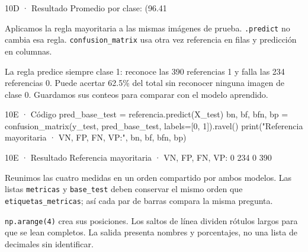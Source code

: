 \begin{Salida}{10D · Resultado}
Promedio por clase: (96.41%
\end{Salida}

\label{paso-10e}

Aplicamos la regla mayoritaria a las mismas imágenes de prueba. \texttt{\small .\allowbreak{}predict} no cambia esa regla. \texttt{\small confusion\_\allowbreak{}matrix} usa otra vez referencia en filas y predicción en columnas.

La regla predice siempre clase 1: reconoce las 390 referencias 1 y falla las 234 referencias 0. Puede acertar 62.5\% del total sin reconocer ninguna imagen de clase 0. Guardamos sus conteos para comparar con el modelo aprendido.


\begin{Codigo}{10E · Código}
pred_base_test = referencia.predict(X_test)
bn, bf, bfn, bp = confusion_matrix(y_test, pred_base_test, labels=[0, 1]).ravel()
print("Referencia mayoritaria · VN, FP, FN, VP:", bn, bf, bfn, bp)
\end{Codigo}

\begin{Salida}{10E · Resultado}
Referencia mayoritaria · VN, FP, FN, VP: 0 234 0 390
\end{Salida}

\label{paso-10f}

Reunimos las cuatro medidas en un orden compartido por ambos modelos. Las listas \texttt{\small metricas} y \texttt{\small base\_\allowbreak{}test} deben conservar el mismo orden que \texttt{\small etiquetas\_\allowbreak{}metricas}; así cada par de barras compara la misma pregunta.

\texttt{\small np.\allowbreak{}arange(\allowbreak{}4)\allowbreak{}} crea sus posiciones. Los saltos de línea dividen rótulos largos para que se lean completos. La salida presenta nombres y porcentajes, no una lista de decimales sin identificar.



